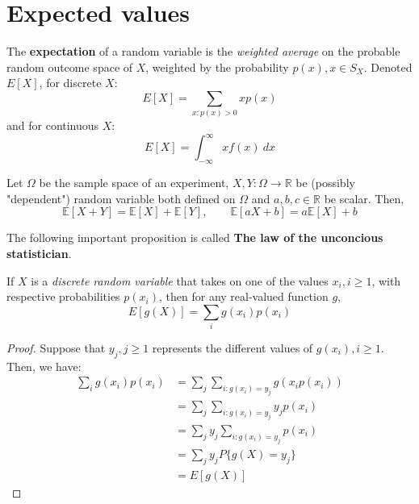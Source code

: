 \section{Expected values}
The \textbf{expectation} of a random variable is the \textit{weighted average} on the probable random outcome space of $X$, weighted by the probability $p(x), x\in S_{X}$. Denoted $E[X]$, for discrete $X$: 
\begin{equation}
    E[X]=\sum_{x:p(x)>0}xp(x)
\end{equation}
and for continuous $X$: 
\begin{equation}
    E[X] = \int_{-\infty}^{\infty} xf(x) \: dx
\end{equation}

\begin{theorem}
    Let $\Omega$ be the sample space of an experiment, $X,Y: \Omega\to \mathbb{R}$ be (possibly "dependent") random variable both defined on $\Omega$ and $a,b,c\in\mathbb{R}$ be scalar. Then, 
    \begin{equation}
        \mathbb{E}[X+Y] = \mathbb{E}[X]+\mathbb{E}[Y],\quad \quad \mathbb{E}[aX+b] = a\mathbb{E}[X] + b
    \end{equation}
\end{theorem}

The following important proposition is called \textbf{The law of the unconcious statistician}. 

\begin{proposition}
    If $X$ is a \textit{discrete random variable} that takes on one of the values $x_{i},i\geq 1$, with respective probabilities $p(x_{i})$, then for any real-valued function $g$, \begin{equation}
        E[g(X)]=\sum_{i}g(x_{i})p(x_{i})
    \end{equation}
\end{proposition}
\begin{proof}
    Suppose that $y_{j},j\geq 1$ represents the different values of $g(x_{i}),i\geq 1$. Then, we have: 
\begin{equation}
    \begin{split}
        \sum_{i} g(x_{i})p(x_{i}) &= \sum_{j}\sum_{i:g(x_{i})=y_{j}} g(x_{i}p(x_{i})) \\
        & = \sum_{j} \sum_{i:g(x_{i})=y_{j}} y_{j}p(x_{i})\\
        & = \sum_{j}y_{j} \sum_{i:g(x_{i})=y_{j}}p(x_{i})\\
        &= \sum_{j}y_{j}P\{ g(X)=y_{j} \}\\
        &= E[g(X)]
        \end{split}
\end{equation}
\end{proof}

